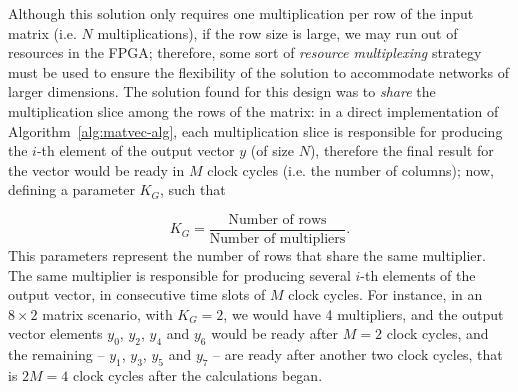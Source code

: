 \documentclass{IEEEtran}
\begin{document}
Although this solution only requires one multiplication per row of the input matrix (i.e. $N$ multiplications), if the row
size is large, we may run out of resources in the FPGA; therefore, some sort of \textit{resource multiplexing} strategy must
be used to ensure the flexibility of the solution to accommodate networks of larger dimensions. The solution found for this
design was to \emph{share} the multiplication slice among the rows of the matrix: in a direct implementation of Algorithm~\ref{alg:matvec-alg},
each multiplication slice is responsible for producing the $i$-th element of the output vector $y$ (of size $N$), therefore the final
result for the vector would be ready in $M$ clock cycles (i.e. the number of columns); now, defining a
parameter $K_G$, such that

\begin{equation}\label{eq:kg}
K_G = \frac{\text{Number of rows}}{\text{Number of multipliers}}.
\end{equation}
This parameters represent the number of rows that share the same multiplier. The
same multiplier is responsible for producing several $i$-th elements of the output vector, in consecutive time slots of $M$ clock cycles.
For instance, in an $8\times2$ matrix scenario, with $K_G = 2$, we would have 4 multipliers, and the output vector
elements $y_0$, $y_2$, $y_4$ and $y_6$ would be ready after $M=2$ clock cycles, and the remaining -- $y_1$, $y_3$, $y_5$ and $y_7$ --  are
ready after another two clock cycles, that is $2M = 4$ clock cycles after the calculations began.
\end{document}
